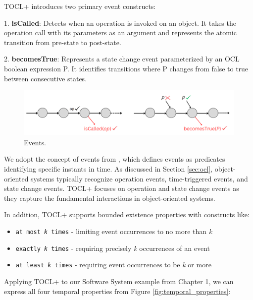 TOCL+ introduces two primary event constructs:

1. \textbf{isCalled}: Detects when an operation is invoked on an object. It takes 
the operation call with its parameters as an argument and represents the atomic 
transition from pre-state to post-state.

2. \textbf{becomesTrue}: Represents a state change event parameterized by an OCL 
boolean expression P. It identifies transitions where P changes from false to true 
between consecutive states.

\begin{figure}
    \centering
    \includegraphics[width=1\textwidth]{figures/c2/events_visual.png}
    \caption{Events.}
    \label{fig:event_constructs}
\end{figure}

We adopt the concept of events from \cite{TemporalAndEventOCL}, which defines events 
as predicates identifying specific instants in time. As discussed in Section 
\ref{sec:ocl}, object-oriented systems typically recognize operation events, 
time-triggered events, and state change events. TOCL+ focuses on operation and 
state change events as they capture the fundamental interactions in object-oriented 
systems.

In addition, TOCL+ supports bounded existence properties with constructs like:
\begin{itemize}
    \item \texttt{at most \textit{k} times} - limiting event occurrences to no more 
    than \textit{k}
    \item \texttt{exactly \textit{k} times} - requiring precisely \textit{k} 
    occurrences of an event
    \item \texttt{at least \textit{k} times} - requiring event occurrences to be 
    \textit{k} or more
\end{itemize}

Applying TOCL+ to our Software System example from Chapter 1, we can express all 
four temporal properties from Figure \ref{fig:temporal_properties}:

